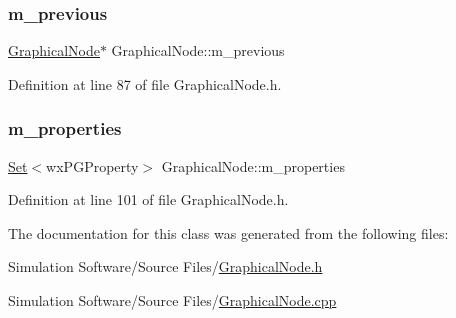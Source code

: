 \mbox{\label{class_graphical_node_a968283abe8cfcfd48900e7d6943cb435}} 
\subsubsection{\texorpdfstring{m\+\_\+previous}{m\_previous}}
{\footnotesize\ttfamily \hyperlink{class_graphical_node}{Graphical\+Node}$\ast$ Graphical\+Node\+::m\+\_\+previous\hspace{0.3cm}{\ttfamily [protected]}}



Definition at line 87 of file Graphical\+Node.\+h.

\mbox{\label{class_graphical_node_a7f45ea17bdca2d822ef4d604effcca0e}} 
\subsubsection{\texorpdfstring{m\+\_\+properties}{m\_properties}}
{\footnotesize\ttfamily \hyperlink{class_set}{Set}$<$wx\+P\+G\+Property$>$ Graphical\+Node\+::m\+\_\+properties\hspace{0.3cm}{\ttfamily [protected]}}



Definition at line 101 of file Graphical\+Node.\+h.



The documentation for this class was generated from the following files\+:\begin{DoxyCompactItemize}
\item 
Simulation Software/\+Source Files/\hyperlink{_graphical_node_8h}{Graphical\+Node.\+h}\item 
Simulation Software/\+Source Files/\hyperlink{_graphical_node_8cpp}{Graphical\+Node.\+cpp}\end{DoxyCompactItemize}
